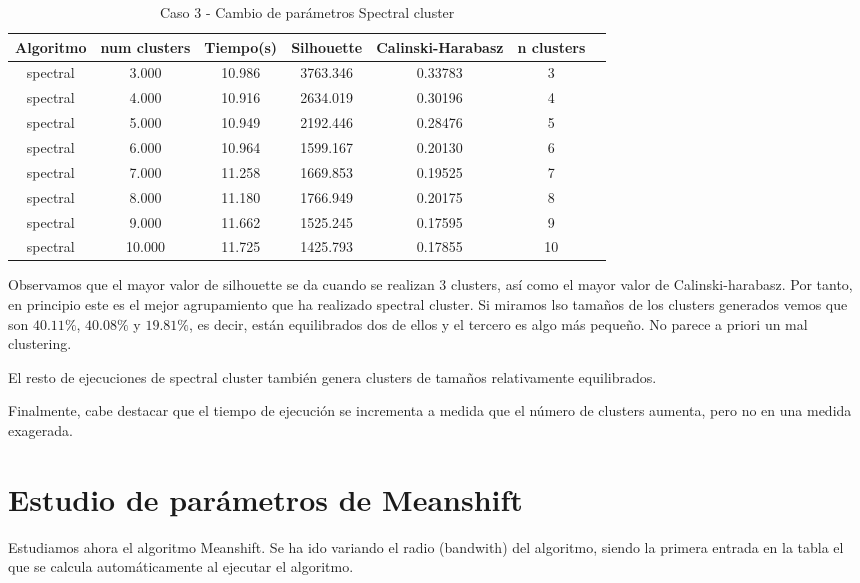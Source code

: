 \begin{table}[H]
\centering
\caption{Caso 3 - Cambio de parámetros Spectral cluster}
\label{tab:c3_spectral}
\begin{tabular}{ccccccc}
\toprule
Algoritmo & num clusters & Tiempo(s) & Silhouette & Calinski-Harabasz & n clusters \\
\midrule
spectral & 3.000 & 10.986 & 3763.346 & 0.33783 & 3 \\
spectral & 4.000 & 10.916 & 2634.019 & 0.30196 & 4 \\
spectral & 5.000 & 10.949 & 2192.446 & 0.28476 & 5 \\
spectral & 6.000 & 10.964 & 1599.167 & 0.20130 & 6 \\
spectral & 7.000 & 11.258 & 1669.853 & 0.19525 & 7 \\
spectral & 8.000 & 11.180 & 1766.949 & 0.20175 & 8 \\
spectral & 9.000 & 11.662 & 1525.245 & 0.17595 & 9 \\
spectral & 10.000 & 11.725 & 1425.793 & 0.17855 & 10 \\
\bottomrule
\end{tabular}
\end{table}

Observamos que el mayor valor de silhouette se da cuando se realizan 3 clusters, así como el mayor valor de Calinski-harabasz. Por tanto, en principio este es el mejor agrupamiento que ha realizado spectral cluster. Si miramos lso tamaños de los clusters generados vemos que son $40.11\%$, $40.08\%$ y $19.81\%$, es decir, están equilibrados dos de ellos y el tercero es algo más pequeño. No parece a priori un mal clustering.

El resto de ejecuciones de spectral cluster también genera clusters de tamaños relativamente equilibrados.

Finalmente, cabe destacar que el tiempo de ejecución se incrementa a medida que el número de clusters aumenta, pero no en una medida exagerada.


\section{Estudio de parámetros de Meanshift}

Estudiamos ahora el algoritmo Meanshift. Se ha ido variando el radio (bandwith) del algoritmo, siendo la primera entrada en la tabla el que se calcula automáticamente al ejecutar el algoritmo.

